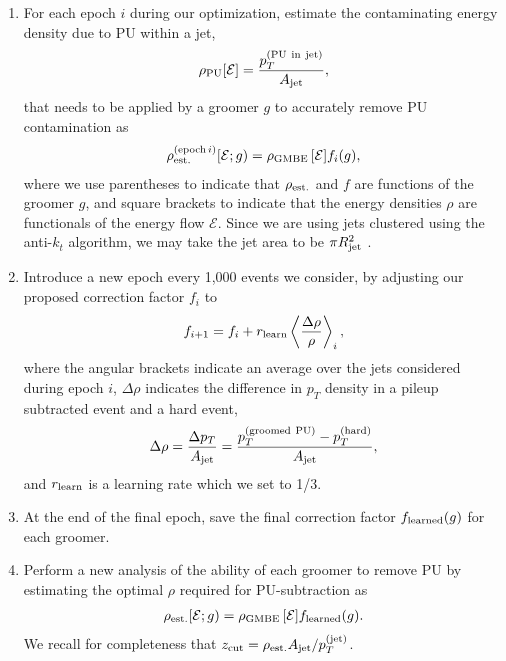 \documentclass[letterpaper,11pt]{article}
\begin{document}
\begin{enumerate}
    \item
    For each epoch \(i\) during our optimization, estimate the contaminating energy density due to PU within a jet,
    \begin{align}
        \rho_{\rm PU}[\mathcal E] = \frac{p_T^{\rm (PU~in~jet)}}{A_{\rm jet}}
        ,
    \end{align}
    that needs to be applied by a groomer \(g\) to accurately remove PU contamination as
    \begin{align}
        \rho^{{\rm(epoch}\,i)}_{\rm est.}[\mathcal E ; g)
        =
        \rho_{\rm GMBE}\,[\mathcal E] f_i(g)
        ,
    \end{align}
    where we use parentheses to indicate that \(\rho_{\rm est.}\) and \(f\) are functions of the groomer \(g\), and square brackets to indicate that the energy densities \(\rho\) are functionals of the energy flow \(\mathcal E\).
    Since we are using jets clustered using the anti-\(k_t\) algorithm, we may take the jet area to be \(\pi R_{\rm jet}^2\) \cite{Cacciari:2008gp}.

    \item
    Introduce a new epoch every 1,000 events we consider, by adjusting our proposed correction factor \(f_i\) to
    \begin{align}
        f_{i + 1}
        =
        f_i + r_{\rm learn}
        \left\langle \frac{\Delta \rho}{\rho} \right\rangle_i
        \label{eqn:epochcorrectionfactor}
        ,
    \end{align}
    where the angular brackets indicate an average over the jets considered during epoch \(i\), \(\Delta \rho\) indicates the difference in \(p_T\) density in a pileup subtracted event and a hard event,
    \begin{align}
        \Delta \rho
        =
        \frac{\Delta p_T}{A_{\rm jet}}
        =
        \frac{p_T^{\rm(groomed~PU)} - p_T^{\rm(hard)}}{A_{\rm jet}}
        ,
    \end{align}
    and \(r_{\rm learn}\) is a learning rate which we set to 1/3.


    \item
    At the end of the final epoch, save the final correction factor \(f_{\rm learned}(g)\) for each groomer.

    \item
    Perform a new analysis of the ability of each groomer to remove PU by estimating the optimal \(\rho\) required for PU-subtraction as
    \begin{align}
        \rho_{\rm est.}[\mathcal E ; g)
        =
        \rho_{\rm GMBE}\,[\mathcal E] f_{\rm learned}(g)
        .
    \end{align}
    We recall for completeness that \(
    	z_{\rm cut}
	=
	\rho_{\rm est.} A_{\rm jet}/p_T^{(\rm jet)}
    \).

\end{enumerate}
\end{document}
